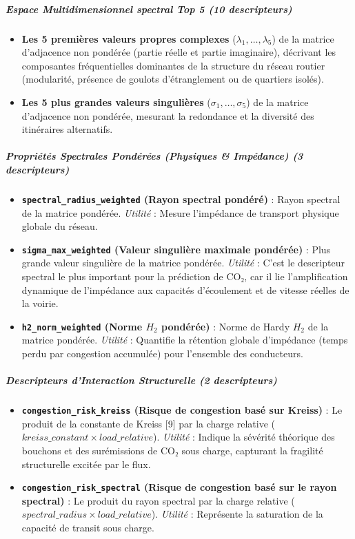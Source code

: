 \documentclass[10pt, a4paper]{article}
\providecommand{\tightlist}{}
\begin{document}
\subparagraph{Espace Multidimensionnel spectral Top 5 (10
descripteurs)}\label{espace-multidimensionnel-spectral-top-5-10-descripteurs-1}

\begin{itemize}
\tightlist
\item
  \textbf{Les 5 premières valeurs propres complexes}
  (\(\lambda_1, \dots, \lambda_5\)) de la matrice d'adjacence non
  pondérée (partie réelle et partie imaginaire), décrivant les
  composantes fréquentielles dominantes de la structure du réseau
  routier (modularité, présence de goulots d'étranglement ou de
  quartiers isolés).
\item
  \textbf{Les 5 plus grandes valeurs singulières}
  (\(\sigma_1, \dots, \sigma_5\)) de la matrice d'adjacence non
  pondérée, mesurant la redondance et la diversité des itinéraires
  alternatifs.
\end{itemize}

\subparagraph{Propriétés Spectrales Pondérées (Physiques \& Impédance)
(3
descripteurs)}\label{propriuxe9tuxe9s-spectrales-ponduxe9ruxe9es-physiques-impuxe9dance-3-descripteurs-1}

\begin{itemize}
\tightlist
\item
  \textbf{\texttt{spectral\_radius\_weighted} (Rayon spectral pondéré)}
  : Rayon spectral de la matrice pondérée. \emph{Utilité} : Mesure
  l'impédance de transport physique globale du réseau.
\item
  \textbf{\texttt{sigma\_max\_weighted} (Valeur singulière maximale
  pondérée)} : Plus grande valeur singulière de la matrice pondérée.
  \emph{Utilité} : C'est le descripteur spectral le plus important pour
  la prédiction de CO₂, car il lie l'amplification dynamique de
  l'impédance aux capacités d'écoulement et de vitesse réelles de la
  voirie.
\item
  \textbf{\texttt{h2\_norm\_weighted} (Norme \(H_2\) pondérée)} : Norme
  de Hardy \(H_2\) de la matrice pondérée. \emph{Utilité} : Quantifie la
  rétention globale d'impédance (temps perdu par congestion accumulée)
  pour l'ensemble des conducteurs.
\end{itemize}

\subparagraph{Descripteurs d'Interaction Structurelle (2
descripteurs)}\label{descripteurs-dinteraction-structurelle-2-descripteurs-1}

\begin{itemize}
\tightlist
\item
  \textbf{\texttt{congestion\_risk\_kreiss} (Risque de congestion basé
  sur Kreiss)} : Le produit de la constante de Kreiss {[}9{]} par la
  charge relative (\(kreiss\_constant \times load\_relative\)).
  \emph{Utilité} : Indique la sévérité théorique des bouchons et des
  surémissions de CO₂ sous charge, capturant la fragilité structurelle
  excitée par le flux.
\item
  \textbf{\texttt{congestion\_risk\_spectral} (Risque de congestion basé
  sur le rayon spectral)} : Le produit du rayon spectral par la charge
  relative (\(spectral\_radius \times load\_relative\)). \emph{Utilité}
  : Représente la saturation de la capacité de transit sous charge.
\end{itemize}
\end{document}
